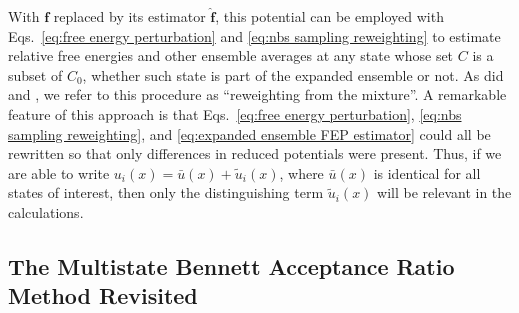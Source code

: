 \documentclass[journal=jctcce,manuscript=article]{achemso}
\newcommand{\vt}[1]{\boldsymbol{\mathbf{#1}}}   %
\begin{document}
With $\vt f$ replaced by its estimator $\hat{\vt f}$, this potential can be employed with Eqs.~\eqref{eq:free energy perturbation} and \eqref{eq:nbs sampling reweighting} to estimate relative free energies and other ensemble averages at any state whose set $C$ is a subset of $C_0$, whether such state is part of the expanded ensemble or not. As did \citeauthor{Geyer_1994} \cite{Geyer_1994} and \citeauthor{Shirts_2017} \cite{Shirts_2017}, we refer to this procedure as ``reweighting from the mixture''. A remarkable feature of this approach is that Eqs.~\eqref{eq:free energy perturbation}, \eqref{eq:nbs sampling reweighting}, and \eqref{eq:expanded ensemble FEP estimator} could all be rewritten so that only differences in reduced potentials were present. Thus, if we are able to write $u_i(x) = {\bar u}(x) + \tilde{u}_i(x)$, where $\bar u(x)$ is identical for all states of interest, then only the distinguishing term $\tilde u_i(x)$ will be relevant in the calculations.

\subsection{The Multistate Bennett Acceptance Ratio Method Revisited}
\end{document}

